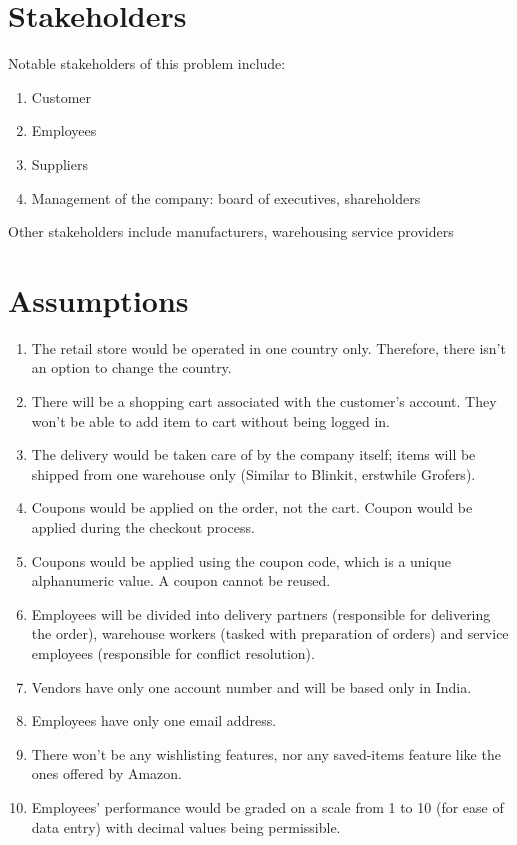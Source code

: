 \documentclass[12pt]{report}
\begin{document}
    \section{Stakeholders}
    Notable stakeholders of this problem include:
    \begin{enumerate}
        \item Customer
        \item Employees
        \item Suppliers
        \item Management of the company: board of executives, shareholders
    \end{enumerate}
    Other stakeholders include manufacturers, warehousing service providers
    
    \section{Assumptions}
    \begin{enumerate}
        \item The retail store would be operated in one country only. Therefore, there isn't an option to change the country.
        \item There will be a shopping cart associated with the customer's account. They won't be able to add item to cart without being logged in.
        \item The delivery would be taken care of by the company itself; items will be shipped from one warehouse only (Similar to Blinkit, erstwhile Grofers).
        \item Coupons would be applied on the order, not the cart. Coupon would be applied during the checkout process.
        \item Coupons would be applied using the coupon code, which is a unique alphanumeric value. A coupon cannot be reused.
        \item Employees will be divided into delivery partners (responsible for delivering the order), warehouse workers (tasked with preparation of orders) and service employees (responsible for conflict resolution).
        \item Vendors have only one account number and will be based only in India.
        \item Employees have only one email address.
        \item There won't be any wishlisting features, nor any saved-items feature like the ones offered by Amazon.
        \item Employees' performance would be graded on a scale from 1 to 10 (for ease of data entry) with decimal values being permissible.
    \end{enumerate}
\end{document}
